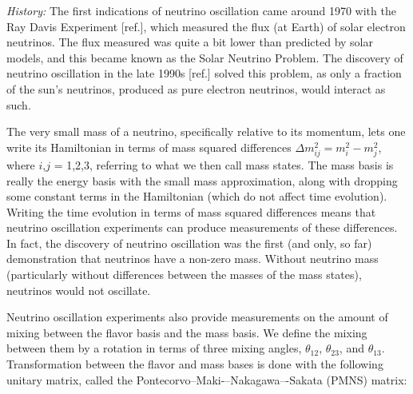 {\color{gray}\emph{History:  }The first indications of neutrino oscillation came around 1970 with the Ray Davis Experiment [ref.], which measured the flux (at Earth) of solar electron neutrinos.  The flux measured was quite a bit lower than predicted by solar models, and this became known as the Solar Neutrino Problem.  The discovery of neutrino oscillation in the late 1990s [ref.] solved this problem, as only a fraction of the sun's neutrinos, produced as pure electron neutrinos, would interact as such.}

The very small mass of a neutrino, specifically relative to its momentum, lets one write its Hamiltonian in terms of mass squared differences $\Delta m_{ij}^{2} = m_{i}^{2} - m_{j}^{2}$, where $i$,$j$ = 1,2,3, referring to what we then call mass states.  The mass basis is really the energy basis with the small mass approximation, along with dropping some constant terms in the Hamiltonian (which do not affect time evolution).  Writing the time evolution in terms of mass squared differences means that neutrino oscillation experiments can produce measurements of these differences.  In fact, the discovery of neutrino oscillation was the first (and only, so far) demonstration that neutrinos have a non-zero mass.  Without neutrino mass (particularly without differences between the masses of the mass states), neutrinos would not oscillate.

Neutrino oscillation experiments also provide measurements on the amount of mixing between the flavor basis and the mass basis.  We define the mixing between them by a rotation in terms of three mixing angles, $\theta_{12}$, $\theta_{23}$, and $\theta_{13}$.  Transformation between the flavor and mass bases is done with the following unitary matrix, called the Pontecorvo--Maki-–Nakagawa–-Sakata (PMNS) matrix:

